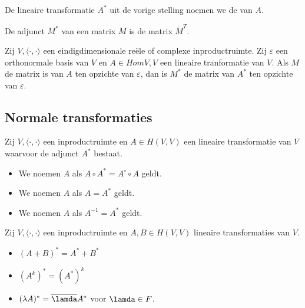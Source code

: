 \documentclass[main.tex]{subfiles}
\begin{document}
\begin{de}
  De lineaire transformatie $A^{*}$ uit de vorige stelling noemen we de  van $A$.
\end{de}

\begin{de}
  De adjunct $M^{*}$ van een matrix $M$ is de matrix $\overline{M}^{T}$.
\end{de}

\begin{ei}
  Zij $V,\langle\cdot,\cdot\rangle$ een eindigdimensionale re\"ele of complexe inproductruimte. 
  Zij $\varepsilon$ een orthonormale basis van $V$ en $A \in Hom{V,V}$ een lineaire tranformatie van $V$.
  Als $M$ de matrix is van $A$ ten opzichte van $\varepsilon$, dan is $M^{*}$ de matrix van $A^{*}$ ten opzichte van $\varepsilon$.
\end{ei}

\subsection{Normale transformaties}
\label{sec:norm-transf-1}

\begin{de}
  Zij $V,\langle\cdot,\cdot\rangle$ een inproductruimte en $A\in H(V,V)$ een lineaire transformatie van $V$ waarvoor de adjunct $A^{*}$ bestaat.
  \begin{itemize}
  \item We noemen $A$  als $A\circ A^{*} = A^{\circ} \circ A$ geldt.
  \item We noemen $A$  als $A=A^{*}$ geldt.
  \item We noemen $A$  als $A^{-1} = A^{*}$ geldt.
  \end{itemize}
\end{de}

\begin{lem}
  Zij $V,\langle\cdot,\cdot\rangle$ een inproductruimte en $A,B \in H(V,V)$ lineaire transformaties van $V$.
  \begin{itemize}
  \item $(A+B)^{*} = A^{*} + B^{*}$
  \item $(A^{k})^{*} = (A^{*})^{k}$
  \item $(\lambda A)^{*} = \overline{\lamda}A^{*}$ voor $\lamda \in F$.
  \end{itemize}
\end{lem}
\end{document}
